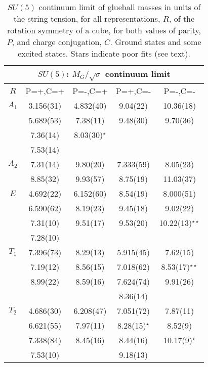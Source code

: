 \documentclass[12pt]{article}
\begin{document}
\begin{table}[htb]
\centering
\begin{tabular}{|c|c|c|c|c|} \hline
\multicolumn{5}{|c|}{$SU(5)$: $M_G/\surd\sigma$  continuum limit} \\ \hline
  $R$   & P=+,C=+ & P=-,C=+ &  P=+,C=-    &  P=-,C=-   \\ \hline
$A_1$  & 3.156(31)  & 4.832(40)  & 9.04(22)  & 10.36(18)  \\
    & 5.689(53)  & 7.38(11)   & 9.48(30)  &  9.70(36)  \\
    & 7.36(14)   & 8.03(30)$^\star$  &     &             \\
    & 7.53(14)   &            &           &             \\ \hline
$A_2$  & 7.31(14)   & 9.80(20)   & 7.333(59) & 8.05(23)  \\
    & 8.85(32)   & 9.93(57)   & 8.75(19)  & 11.03(37)  \\ \hline
$E$   & 4.692(22)  & 6.152(60)  & 8.54(19)  & 8.000(51)  \\
    & 6.590(62)  & 8.19(23)   & 9.45(18)  & 9.02(22)   \\
    & 7.31(10)   & 9.51(17)   & 9.53(20)  & 10.22(13)$^{\star\star}$  \\
    & 7.28(10)   &            &           &             \\ \hline
$T_1$  & 7.396(73)  & 8.29(13)   & 5.915(45) & 7.62(15)  \\
    & 7.19(12)   & 8.56(15)   & 7.018(62) & 8.53(17)$^{\star\star}$  \\
    & 8.99(22)   & 8.59(16)   & 7.624(74) & 9.91(26)    \\
    &            &            & 8.36(14)  &             \\ \hline
$T_2$  & 4.686(30)  & 6.208(47)  & 7.051(72) & 7.87(11)     \\
    & 6.621(55)  & 7.97(11)   & 8.28(15)$^\star$ & 8.52(9)  \\
    & 7.338(84)  & 8.45(16)   & 8.44(16)  & 10.17(9)$^{\star}$  \\
    & 7.53(10)   &            & 9.18(13)  &   \\ \hline
\end{tabular}
\caption{$SU(5)$ continuum limit of glueball masses in units of the string tension,
  for all representations, $R$, of the rotation symmetry of a cube, for
  both values of parity, $P$, and charge conjugation, $C$.
  Ground states and some excited states. Stars
  indicate poor fits (see text).}
\label{table_MK_R_SU5}
\end{table}
\end{document}
